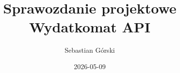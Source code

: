 \documentclass[12pt,oneside,a4paper]{book}
\title{Sprawozdanie projektowe Wydatkomat API}
\author{Sebastian Górski}
\date{2026-05-09}
\begin{document}
	
	
	
	\tableofcontents
	\newpage
	
	
	
	\listoffigures
	\lstlistoflistings
	
\end{document}
